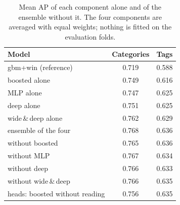 \begin{table}[t]
\centering\small
\caption{Mean AP of each component alone and of the ensemble without it. The four components are averaged with equal weights; nothing is fitted on the evaluation folds.}
\label{tab:v2-components}
\begin{tabular}{lcc}
\toprule
Model & Categories & Tags \\
\midrule
gbm+win (reference) & 0.719 & 0.588 \\
\midrule
boosted alone & 0.749 & 0.616 \\
MLP alone & 0.747 & 0.625 \\
deep alone & 0.751 & 0.625 \\
wide\,\&\,deep alone & 0.762 & 0.629 \\
ensemble of the four & 0.768 & 0.636 \\
\midrule
\quad without boosted & 0.765 & 0.636 \\
\quad without MLP & 0.767 & 0.634 \\
\quad without deep & 0.766 & 0.633 \\
\quad without wide\,\&\,deep & 0.766 & 0.635 \\
\quad \SV{} heads: boosted without reading & 0.756 & 0.635 \\
\bottomrule
\end{tabular}
\end{table}
